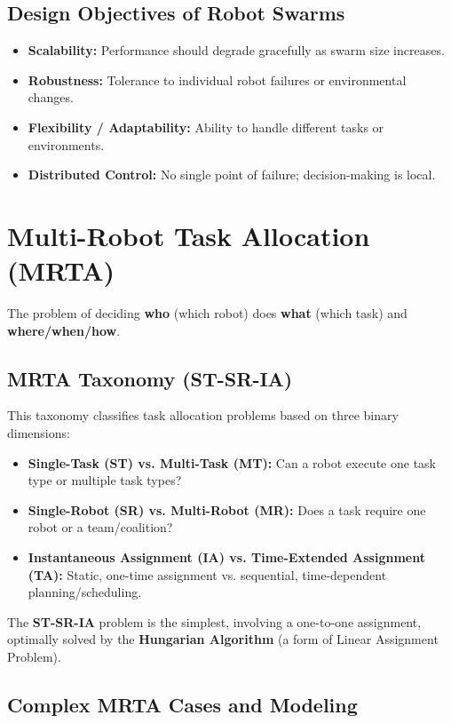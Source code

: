 \documentclass{report}
\begin{document}
\subsection*{Design Objectives of Robot Swarms}
\begin{itemize}
    \item \textbf{Scalability:} Performance should degrade gracefully as swarm size increases.
    \item \textbf{Robustness:} Tolerance to individual robot failures or environmental changes.
    \item \textbf{Flexibility / Adaptability:} Ability to handle different tasks or environments.
    \item \textbf{Distributed Control:} No single point of failure; decision-making is local.
\end{itemize}

\section*{Multi-Robot Task Allocation (MRTA)}
The problem of deciding \textbf{who} (which robot) does \textbf{what} (which task) and \textbf{where/when/how}.

\subsection*{MRTA Taxonomy (ST-SR-IA)}
This taxonomy classifies task allocation problems based on three binary dimensions:
\begin{itemize}
    \item \textbf{Single-Task (ST) vs. Multi-Task (MT):} Can a robot execute one task type or multiple task types?
    \item \textbf{Single-Robot (SR) vs. Multi-Robot (MR):} Does a task require one robot or a team/coalition?
    \item \textbf{Instantaneous Assignment (IA) vs. Time-Extended Assignment (TA):} Static, one-time assignment vs. sequential, time-dependent planning/scheduling.
\end{itemize}

The \textbf{ST-SR-IA} problem is the simplest, involving a one-to-one assignment, optimally solved by the \textbf{Hungarian Algorithm} (a form of Linear Assignment Problem).

\subsection*{Complex MRTA Cases and Modeling}
\end{document}
